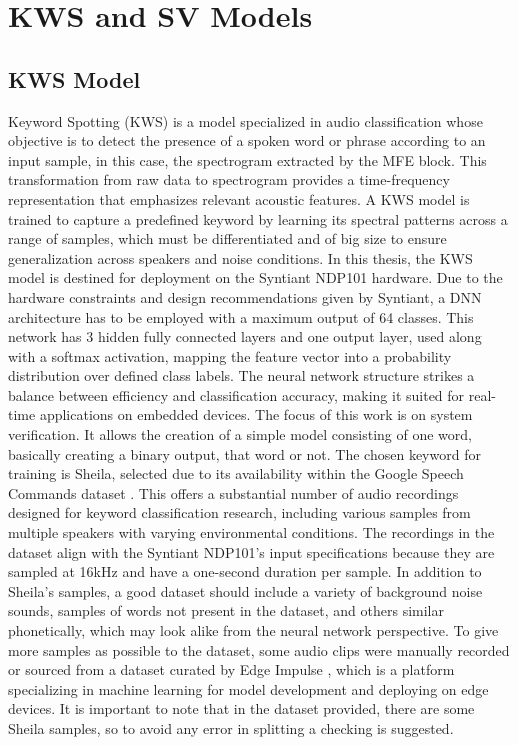 \chapter{KWS and SV Models}
\label{cha:training}
\section{KWS Model}
\label{sec:kws deployment}
Keyword Spotting (KWS) is a model specialized in audio classification whose objective is to detect the presence of a spoken word or phrase according to an input sample, in this case, the spectrogram extracted by the MFE block. This transformation from raw data to spectrogram provides a time-frequency representation that emphasizes relevant acoustic features. A KWS model is trained to capture a predefined keyword by learning its spectral patterns across a range of samples, which must be differentiated and of big size to ensure generalization across speakers and noise conditions.
In this thesis, the KWS model is destined for deployment on the Syntiant NDP101 hardware. Due to the hardware constraints and design recommendations given by Syntiant, a DNN architecture has to be employed with a maximum output of 64 classes. This network has 3 hidden fully connected layers and one output layer, used along with a softmax activation, mapping the feature vector into a probability distribution over defined class labels. The neural network structure strikes a balance between efficiency and classification accuracy, making it suited for real-time applications on embedded devices.
The focus of this work is on system verification. It allows the creation of a simple model consisting of one word, basically creating a binary output, that word or not. The chosen keyword for training is Sheila, selected due to its availability within the Google Speech Commands dataset \cite{speechcommands}. This offers a substantial number of audio recordings designed for keyword classification research, including various samples from multiple speakers with varying environmental conditions.
The recordings in the dataset align with the Syntiant NDP101's input specifications because they are sampled at 16kHz and have a one-second duration per sample. In addition to Sheila’s samples, a good dataset should include a variety of background noise sounds, samples of words not present in the dataset, and others similar phonetically, which may look alike from the neural network perspective. To give more samples as possible to the dataset, some audio clips were manually recorded or sourced from a dataset curated by Edge Impulse \cite{edgeimpulse_dataset_499022}, which is a platform specializing in machine learning for model development and deploying on edge devices. It is important to note that in the dataset provided, there are some Sheila samples, so to avoid any error in splitting a checking is suggested.
